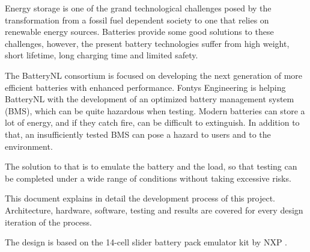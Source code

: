 \IEEEPARstart
{E}{nergy} storage is one of the grand technological challenges posed by the transformation from a
fossil fuel dependent society to one that relies on renewable energy sources. Batteries provide
some good solutions to these challenges, however, the present battery technologies suffer from
high weight, short lifetime, long charging time and limited safety.

The BatteryNL consortium is focused on developing the next generation of more efficient
batteries with enhanced performance. Fontys Engineering is helping BatteryNL with the development 
of an optimized battery management system (BMS), which can be quite
hazardous when testing. Modern batteries can store a lot of energy, and if they catch fire, can be difficult to
extinguish. In addition to that, an insufficiently tested BMS can pose a hazard to users and to
the environment.

The solution to that is to emulate the battery and the load, so that testing can be completed
under a wide range of conditions without taking excessive risks.

This document explains in detail the development process of this project. 
Architecture, hardware, software, testing and results are covered for every design 
iteration of the process. 

The design is based on the 14-cell slider battery pack emulator kit by 
NXP \cite{UM11349}.